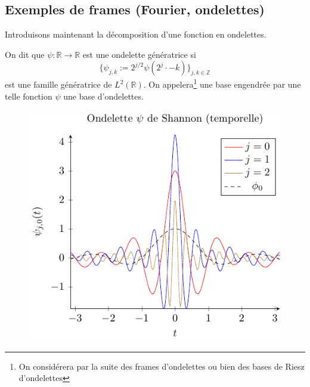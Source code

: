 \subsection{Exemples de frames (Fourier, ondelettes)}
Introduisons maintenant la décomposition d'une fonction en ondelettes.
\begin{definition}
	On dit que $\psi:\mathbb{R} \to \mathbb{R}$ est une ondelette génératrice si 
	\begin{equation}
		\{\psi_{j,k} := 2^{j/2}\psi(2^j\cdot - k)\}_{j,k \in \mathbb{Z}}
	\end{equation}
	est une famille génératrice de $L^2(\mathbb{R})$.
	On appelera\footnote{On considérera par la suite des frames d'ondelettes ou bien des bases de Riesz d'ondelettes} une base engendrée par une telle fonction $\psi$ une base d'ondelettes.
\end{definition}
\begin{figure}
	\includegraphics{Figs/shannon}
\end{figure}
